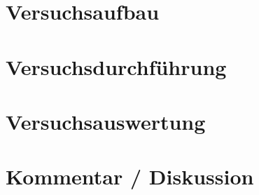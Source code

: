 \documentclass[a4 paper, 11pt]{article}
\begin{document}
\section{Versuchsaufbau}
\section{Versuchsdurchführung}
\section{Versuchsauswertung}
\section{Kommentar / Diskussion}
\end{document}
